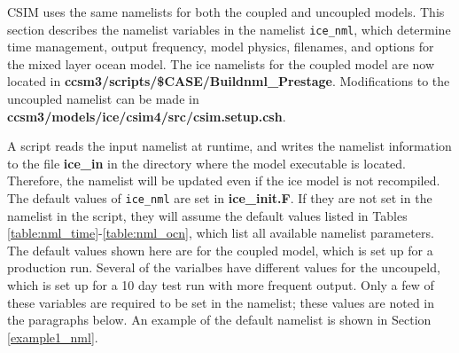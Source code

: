 
CSIM uses the same namelists for both the coupled and uncoupled models.
This section describes the namelist variables in the namelist {\tt ice\_nml},
which determine time management, output frequency, model physics, filenames,
and options for the mixed layer ocean model. 
The ice namelists for the coupled model are now located in
{\bf ccsm3/scripts/\$CASE/Buildnml\_Prestage}.  Modifications to the
uncoupled namelist can be made in {\bf ccsm3/models/ice/csim4/src/csim.setup.csh}.

A script reads the input namelist at runtime, and writes the namelist
information to the file {\bf ice\_in} in the directory where the model executable
is located.  Therefore, the namelist will be updated even if the ice model
is not recompiled.  The default values of {\tt ice\_nml} are set in 
{\bf ice\_init.F}.  If they are not set in the namelist in the script, they will
assume the default values listed in Tables \ref{table:nml_time}-\ref{table:nml_ocn},
which list all available namelist parameters.  The default values shown here are
for the coupled model, which is set up for a production run.  Several of the
varialbes have different values for the uncoupeld, which is set up for a 10
day test run with more frequent output.  Only a few of these variables are
required to be set in the namelist; these values are noted in the paragraphs
below.  An example of the default namelist is shown in Section \ref{example1_nml}.


